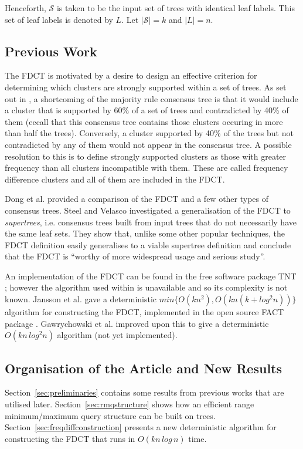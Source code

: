 \documentclass{article}
\begin{document}
    Henceforth, $\mathcal{S}$ is taken to be the input set of trees with identical leaf labels. This set of leaf labels is denoted by $L$. Let $|\mathcal{S}| = k$ and $|L| = n$.

    \subsection{Previous Work}
    The FDCT is motivated by a desire to design an effective criterion for determining which clusters are strongly supported within a set of trees. As set out in \cite{goloboff2003improvements}, a shortcoming of the majority rule consensus tree is that it would include a cluster that is supported by 60\% of a set of trees and contradicted by 40\% of them (eecall that this consensus tree contains those clusters occuring in more than half the trees). Conversely, a cluster supported by 40\% of the trees but not contradicted by any of them would not appear in the consensus tree. A possible resolution to this is to define strongly supported clusters as those with greater frequency than all clusters incompatible with them. These are called frequency difference clusters and all of them are included in the FDCT.

    Dong et al. \cite{dong2010majority} provided a comparison of the FDCT and a few other types of consensus trees. Steel and Velasco \cite{steel2014axiomatic} investigated a generalisation of the FDCT to \textit{supertrees}, i.e. consensus trees built from input trees that do not necessarily have the same leaf sets. They show that, unlike some other popular techniques, the FDCT definition easily generalises to a viable supertree definition and conclude that the FDCT is ``worthy of more widespread usage and serious study''.

    An implementation of the FDCT can be found in the free software package TNT \cite{goloboff2008tnt}; however the algorithm used within is unavailable and so its complexity is not known. Jansson et al. \cite{jansson2018algorithms} gave a deterministic $min\{O(kn^2), O(kn(k + log^2 n))\}$ algorithm for constructing the FDCT, implemented in the open source FACT package \cite{jansson2016improved}. Gawrychowski et al. \cite{gawrychowski2017faster} improved upon this to give a deterministic $O(kn\,log^2n)$ algorithm (not yet implemented).

    \subsection{Organisation of the Article and New Results}
    Section~\ref{sec:preliminaries} contains some results from previous works that are utilised later. Section~\ref{sec:rmqstructure} shows how an efficient range minimum/maximum query structure can be built on trees. Section~\ref{sec:freqdiffconstruction} presents a new deterministic algorithm for constructing the FDCT that runs in $O(kn\,log\,n)$ time.
\end{document}
